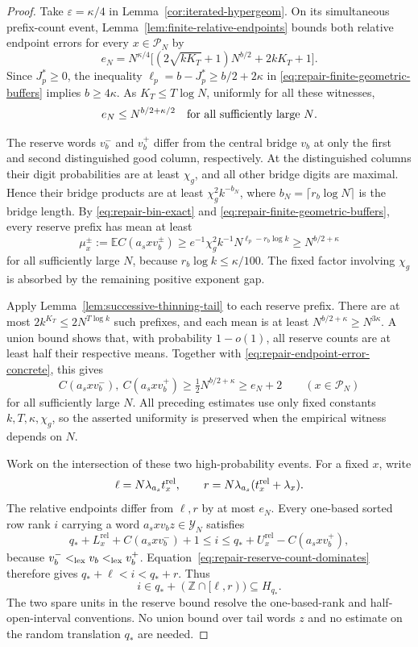 \documentclass[11pt]{article}
\numberwithin{equation}{section}
\newcommand{\E}{\mathbb E}
\newcommand{\1}{\mathbf 1}
\begin{document}
\begin{proof}
Take \(\varepsilon=\kappa/4\) in
Lemma~\ref{cor:iterated-hypergeom}.  On its simultaneous
prefix-count event, Lemma~\ref{lem:finite-relative-endpoints} bounds
both relative endpoint errors for every \(x\in\mathcal P_N\)
by
\[
 e_N=N^{\kappa/4}
       \bigl[(2\sqrt{kK_T}+1)N^{b/2}+2kK_T+1\bigr].
\]
Since \(J_p^*\ge0\), the inequality
\(\ell_p=b-J_p^*\ge b/2+2\kappa\) in
\eqref{eq:repair-finite-geometric-buffers} implies \(b\ge4\kappa\).
As \(K_T\le T\log N\), uniformly for all these witnesses,
\begin{equation}
\label{eq:repair-endpoint-error-concrete}
 e_N\le N^{b/2+\kappa/2}
 \quad\hbox{for all sufficiently large \(N\)}.
\end{equation}

The reserve words \(v_b^-\) and \(v_b^+\) differ from the central
bridge \(v_b\) at only the first and second distinguished good
column, respectively.  At the distinguished columns their digit
probabilities are at least \(\chi_g\), and all other bridge digits
are maximal.  Hence their bridge products are at least
\(\chi_g^2k^{-b_N}\), where
\(b_N=\lceil r_b\log N\rceil\) is the bridge length.  By
\eqref{eq:repair-bin-exact} and
\eqref{eq:repair-finite-geometric-buffers}, every reserve prefix has
mean at least
\[
 \mu_x^\pm:=\E C(a_sxv_b^\pm)
 \ge e^{-1}\chi_g^2 k^{-1}
       N^{\ell_p-r_b\log k}
 \ge N^{b/2+\kappa}
\]
for all sufficiently large \(N\), because
\(r_b\log k\le\kappa/100\).  The fixed factor involving
\(\chi_g\) is absorbed by the remaining positive exponent gap.

Apply Lemma~\ref{lem:successive-thinning-tail} to each reserve
prefix.  There are at most \(2k^{K_T}\le2N^{T\log k}\) such
prefixes, and each mean is at least \(N^{b/2+\kappa}\ge N^{3\kappa}\).
A union bound shows that, with probability \(1-o(1)\), all reserve
counts are at least half their respective means.  Together with
\eqref{eq:repair-endpoint-error-concrete}, this gives
\begin{equation}
\label{eq:repair-reserve-count-dominates}
 C(a_sxv_b^-),\ C(a_sxv_b^+)
 \ge \tfrac12N^{b/2+\kappa}\ge e_N+2
 \qquad(x\in\mathcal P_N)
\end{equation}
for all sufficiently large \(N\).  All preceding estimates use only
fixed constants \(k,T,\kappa,\chi_g\), so the asserted uniformity
is preserved when the empirical witness depends on \(N\).

Work on the intersection of these two high-probability events.
For a fixed \(x\), write
\[
 \ell=N\lambda_{a_s}t_x^{\rm rel},\qquad
 r=N\lambda_{a_s}(t_x^{\rm rel}+\lambda_x).
\]
The relative endpoints differ from \(\ell,r\) by at most
\(e_N\).  Every one-based sorted row rank \(i\) carrying a word
\(a_sxv_bz\in\mathcal Y_N\) satisfies
\[
 q_*+L_x^{\mathrm{rel}}+C(a_sxv_b^-)+1
 \le i\le
 q_*+U_x^{\mathrm{rel}}-C(a_sxv_b^+),
\]
because \(v_b^-<_{\rm lex}v_b<_{\rm lex}v_b^+\).
Equation~\eqref{eq:repair-reserve-count-dominates} therefore gives
\(q_*+\ell<i<q_*+r\).  Thus
\[
 i\in q_*+(\mathbb Z\cap[\ell,r))\subseteq H_{q_*}.
\]
The two spare units in the reserve bound resolve the one-based-rank
and half-open-interval conventions.  No union bound over tail words
\(z\) and no estimate on the random translation \(q_*\) are needed.


\end{proof}
\end{document}
